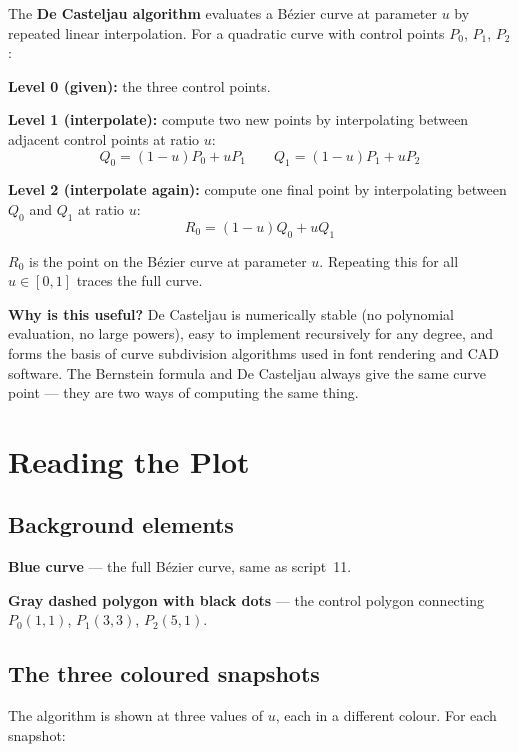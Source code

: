 \documentclass[12pt, a4paper]{article}
\begin{document}
The \textbf{De Casteljau algorithm} evaluates a B\'ezier
curve at parameter $u$ by repeated linear interpolation.
For a quadratic curve with control points $P_0$, $P_1$, $P_2$:

\textbf{Level 0 (given):} the three control points.

\textbf{Level 1 (interpolate):} compute two new points by
interpolating between adjacent control points at ratio $u$:
\[
  Q_0 = (1-u) P_0 + u P_1
  \qquad
  Q_1 = (1-u) P_1 + u P_2
\]

\textbf{Level 2 (interpolate again):} compute one final point
by interpolating between $Q_0$ and $Q_1$ at ratio $u$:
\[
  R_0 = (1-u) Q_0 + u Q_1
\]

$R_0$ is the point on the B\'ezier curve at parameter $u$.
Repeating this for all $u \in [0,1]$ traces the full curve.

\begin{notebox}
\textbf{Why is this useful?}
De Casteljau is numerically stable (no polynomial evaluation,
no large powers), easy to implement recursively for any degree,
and forms the basis of curve subdivision algorithms used in
font rendering and CAD software.
The Bernstein formula and De Casteljau always give the same
curve point --- they are two ways of computing the same thing.
\end{notebox}


\section{Reading the Plot}

\subsection{Background elements}

\textbf{Blue curve} --- the full B\'ezier curve, same as script~11.

\textbf{Gray dashed polygon with black dots} --- the control polygon
connecting $P_0(1,1)$, $P_1(3,3)$, $P_2(5,1)$.

\subsection{The three coloured snapshots}

The algorithm is shown at three values of $u$, each in a
different colour. For each snapshot:
\end{document}
